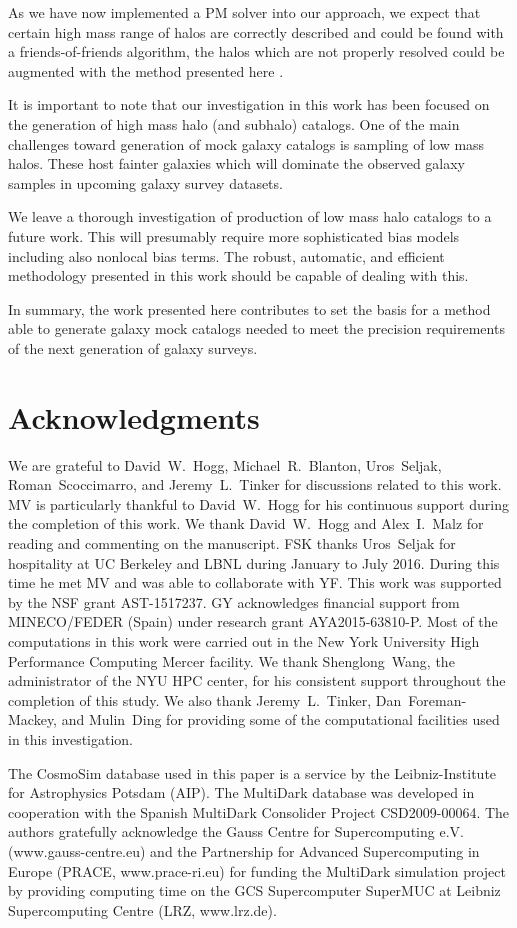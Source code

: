 \documentclass[english,usenatbib]{mn2e}
\begin{document}
As we have now implemented a PM solver into our approach, we expect that certain high mass range of halos are correctly described and could be found with a friends-of-friends algorithm, the halos which are not properly resolved could be augmented with the method presented here  \citep[see methods to extend the resolution of $N$-body simulations,][]{delatorre,angulo2014,ahn2015}.  

It is important to note that our investigation in this work has been focused on the generation of high mass halo (and subhalo) catalogs. One of the main challenges toward generation of mock galaxy catalogs is sampling of low mass halos. These host fainter galaxies which will dominate the observed galaxy samples in upcoming galaxy survey datasets. 

We leave a thorough investigation of production of low mass halo catalogs to a future work. This will presumably require more sophisticated bias models including also nonlocal bias terms. The robust, automatic, and efficient methodology presented in this work should be capable of dealing with this.


In summary, the work presented here contributes to set the basis for a method able to generate galaxy mock catalogs needed to meet the precision requirements of the next generation of galaxy surveys. 


\section*{Acknowledgments}

We are grateful to David~W.~Hogg, Michael~R.~Blanton, Uros~Seljak, Roman~Scoccimarro, and Jeremy~L.~Tinker for discussions related to this work.
MV is particularly thankful to David~W.~Hogg for his continuous support during the completion of this work. We thank David~W.~Hogg and Alex~I.~Malz for reading and commenting on the manuscript.
FSK thanks Uros~Seljak for hospitality at UC Berkeley and LBNL during January to July 2016. During this time he met MV and was able to collaborate with YF.
This work was supported by the NSF grant AST-1517237. GY acknowledges financial support from MINECO/FEDER  (Spain) under research grant AYA2015-63810-P. Most of the computations in this work were carried out in the New York University High Performance Computing Mercer facility. We thank Shenglong~Wang, the administrator of the NYU HPC center, for his consistent support throughout the completion of this study. We also thank Jeremy~L.~Tinker, Dan~Foreman-Mackey, and Mulin~Ding for providing some of the computational facilities used in this investigation.

The CosmoSim database used in this paper is a service by the Leibniz-Institute for Astrophysics Potsdam (AIP). The MultiDark database was developed in cooperation with the Spanish MultiDark Consolider Project CSD2009-00064. The authors gratefully acknowledge the Gauss Centre for Supercomputing e.V. (www.gauss-centre.eu) and the Partnership for Advanced Supercomputing in Europe (PRACE, www.prace-ri.eu) for funding the MultiDark simulation project by providing computing time on the GCS Supercomputer SuperMUC at Leibniz Supercomputing Centre (LRZ, www.lrz.de).


\end{document}
